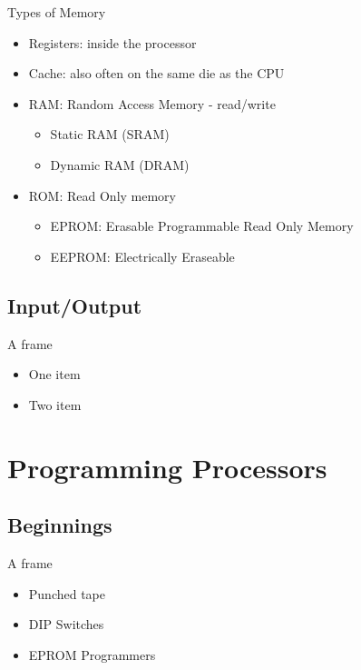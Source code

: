 \documentclass{beamer}
\begin{document}
\begin{frame}{Types of Memory}
  \begin{itemize}
  \item
    Registers: inside the processor
  \item
    Cache: also often on the same die as the CPU
  \item
    RAM: Random Access Memory - read/write
    \begin{itemize}
    \item
      Static RAM (SRAM)
    \item
      Dynamic RAM (DRAM)
    \end{itemize}
  \item
    ROM: Read Only memory
    \begin{itemize}
    \item
      EPROM: Erasable Programmable Read Only Memory
    \item
      EEPROM: Electrically Eraseable
    \end{itemize}
  \end{itemize}
\end{frame}

\subsection[IO]{Input/Output}

\begin{frame}{A frame}
  \begin{itemize}
  \item
    One item
  \item
    Two item
  \end{itemize}
\end{frame}

\section{Programming Processors}

\subsection[Older]{Beginnings}

\begin{frame}{A frame}
  \begin{itemize}
  \item
    Punched tape
  \item
    DIP Switches
  \item
    EPROM Programmers
  \end{itemize}
\end{frame}
\end{document}
